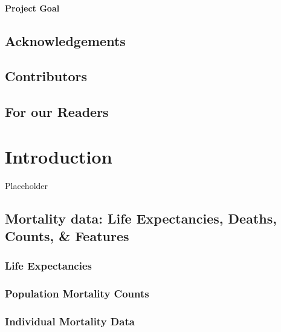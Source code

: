 \documentclass[
]{book}
\begin{document}
\hypertarget{project-goal}{%
\subsubsection*{Project Goal}\label{project-goal}}

\hypertarget{acknowledgements}{%
\section*{Acknowledgements}\label{acknowledgements}}

\hypertarget{contributors}{%
\section*{Contributors}\label{contributors}}

\hypertarget{for-our-readers}{%
\section*{For our Readers}\label{for-our-readers}}

\hypertarget{introduction}{%
\chapter{Introduction}\label{introduction}}

Placeholder

\hypertarget{S:MortData}{%
\section{Mortality data: Life Expectancies, Deaths, Counts, \& Features}\label{S:MortData}}

\hypertarget{life-expectancies}{%
\subsection{Life Expectancies}\label{life-expectancies}}

\hypertarget{population-mortality-counts}{%
\subsection{Population Mortality Counts}\label{population-mortality-counts}}

\hypertarget{S:IndivMortData}{%
\subsection{Individual Mortality Data}\label{S:IndivMortData}}
\end{document}
